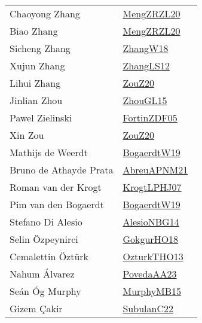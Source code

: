 {\begin{longtable}{p{4cm}p{20cm}}
Chaoyong Zhang & \href{articles/MengZRZL20.pdf}{MengZRZL20}~\cite{MengZRZL20}\\
Biao Zhang & \href{articles/MengZRZL20.pdf}{MengZRZL20}~\cite{MengZRZL20}\\
Sicheng Zhang & \href{articles/ZhangW18.pdf}{ZhangW18}~\cite{ZhangW18}\\
Xujun Zhang & \href{papers/ZhangLS12.pdf}{ZhangLS12}~\cite{ZhangLS12}\\
Lihui Zhang & \href{}{ZouZ20}~\cite{ZouZ20}\\
Jinlian Zhou & \href{papers/ZhouGL15.pdf}{ZhouGL15}~\cite{ZhouGL15}\\
Pawel Zielinski & \href{papers/FortinZDF05.pdf}{FortinZDF05}~\cite{FortinZDF05}\\
Xin Zou & \href{}{ZouZ20}~\cite{ZouZ20}\\
Mathijs de Weerdt & \href{papers/BogaerdtW19.pdf}{BogaerdtW19}~\cite{BogaerdtW19}\\
Bruno de Athayde Prata & \href{}{AbreuAPNM21}~\cite{AbreuAPNM21}\\
Roman van der Krogt & \href{papers/KrogtLPHJ07.pdf}{KrogtLPHJ07}~\cite{KrogtLPHJ07}\\
Pim van den Bogaerdt & \href{papers/BogaerdtW19.pdf}{BogaerdtW19}~\cite{BogaerdtW19}\\
Stefano {Di Alesio} & \href{papers/AlesioNBG14.pdf}{AlesioNBG14}~\cite{AlesioNBG14}\\
Selin {\"{O}}zpeynirci & \href{}{GokgurHO18}~\cite{GokgurHO18}\\
Cemalettin {\"{O}}zt{\"{u}}rk & \href{articles/OzturkTHO13.pdf}{OzturkTHO13}~\cite{OzturkTHO13}\\
Nahum {\'{A}}lvarez & \href{papers/PovedaAA23.pdf}{PovedaAA23}~\cite{PovedaAA23}\\
Se{\'{a}}n {\'{O}}g Murphy & \href{papers/MurphyMB15.pdf}{MurphyMB15}~\cite{MurphyMB15}\\
Gizem {\c{C}}akir & \href{articles/SubulanC22.pdf}{SubulanC22}~\cite{SubulanC22}\\
\end{longtable}
}

